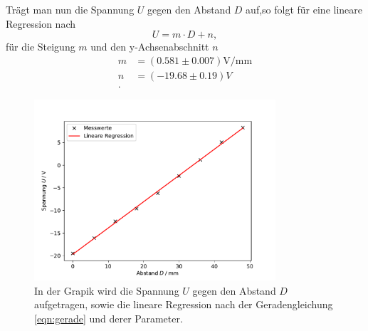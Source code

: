     Trägt man nun die Spannung $U$ gegen den Abstand $D$ auf,so folgt für eine lineare 
    Regression nach 
    \begin{equation}
        U=m\cdot D + n,
        \label{eqn:gerade}
    \end{equation}
    für die Steigung $m$ und den y-Achsenabschnitt $n$
    \begin{align*}
        m&=(0.581\pm0.007) \si{\volt\per\mm}\\
        n&=(-19.68\pm0.19) \si{V}\\.
    \end{align*}
    \begin{figure}[H]
        \centering
        \includegraphics[width=0.8\textwidth]{plot.pdf}
        \caption{In der Grapik wird die Spannung $U$ gegen den Abstand $D$ aufgetragen, sowie 
        die lineare Regression nach der Geradengleichung \ref{eqn:gerade} und derer Parameter.}
    \end{figure}